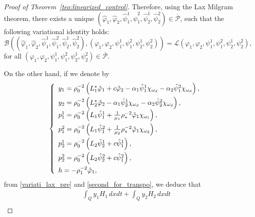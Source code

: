 \documentclass[11pt,a4paper]{amsart}
\numberwithin{equation}{section}
\begin{document}
\begin{proof}[Proof of Theorem~\ref{teo:linearized_control}]
Therefore, using the  Lax Milgram  theorem,   there exists a unique  $(\hat{\varphi}_{1},\hat{\varphi}_{2},\hat{\psi}^{1}_{1},\hat{\psi}^{2}_{1},\hat{\psi}^{1}_{2},\hat{\psi}^{2}_{2})\in \overline{\mathcal{P}}$, such that the following variational identity holds:
\begin{equation}\label{variati_lax_pre}
\mathcal{B}\left( (\hat{\varphi}_{1},\hat{\varphi}_{2},\hat{\psi}^{1}_{1},\hat{\psi}^{2}_{1},\hat{\psi}^{1}_{2},\hat{\psi}^{2}_{2}), (\varphi_{1},\varphi_{2},\psi^{1}_{1},\psi^{2}_{1},\psi^{1}_{2},\psi^{2}_{2}) \right) = \mathcal{L}(\varphi_{1},\varphi_{2},\psi^{1}_{1},\psi^{2}_{1},\psi^{1}_{2},\psi^{2}_{2}),
\end{equation}for all $(\varphi_{1},\varphi_{2},\psi^{1}_{1},\psi^{2}_{1},\psi^{1}_{2},\psi^{2}_{2})\in \overline{\mathcal{P}}$.

On the other hand, if we denote by
\begin{equation}\label{second_for_transpo}
\left\{\begin{array}{l}
y_{1}=\rho^{-2}_{0}\left(L^{*}_{1}\hat{\varphi}_{1}+c\hat{\varphi}_{2}-\alpha_{1}\hat{\psi}^{1}_{1}\chi_{\omega_{d}}-\alpha_{2}\hat{\psi}^{2}_{1}\chi_{\omega_{d}} \right),\\
	\noalign{\smallskip}
	y_{2}=\rho^{-2}_{0}\left(L^{*}_{2}\hat{\varphi}_{2}-\alpha_{1}\hat{\psi}^{1}_{2}\chi_{\omega_{d}}-\alpha_{2}\hat{\psi}^{2}_{2}\chi_{\omega_{d}} \right),\\
	p^{1}_{1}= \rho^{-2}_{0}\left( L_{1}\hat{\psi}^{1}_{1}+\frac{1}{\mu_{1}}\rho^{-2}_{*}\hat{\varphi}_{1}\chi_{\omega_{1}}  \right), \\
	\noalign{\smallskip}
	p^{2}_{1}= \rho^{-2}_{0}\left( L_{1}\hat{\psi}^{2}_{1}+\frac{1}{\mu_{2}}\rho^{-2}_{*}\hat{\varphi}_{1}\chi_{\omega_{2}}  \right), \\
	\noalign{\smallskip}
	p^{1}_{2}= \rho^{-2}_{0}\left( L_{2}\hat{\psi}^{1}_{2}+c \hat{\psi}^{1}_{1}\right), \\
	\noalign{\smallskip}
	p^{2}_{2}= \rho^{-2}_{0}\left( L_{2}\hat{\psi}^{2}_{2}+ c \hat{\psi}^{2}_{1} \right), \\
	\noalign{\smallskip}
	h=-\rho^{-2}_{1}\hat{\varphi}_{1},
\end{array}\right.
\end{equation}from \eqref{variati_lax_pre} and \eqref{second_for_transpo}, we deduce that
\begin{equation}\label{vara_2identi_2}
\begin{array}{l}
	\displaystyle \int_{Q}y_{1}H_{1}\,dxdt+\int_{Q}y_{2}H_{2}\,dxdt\\

\end{array}
\end{equation}
\end{proof}
\end{document}
